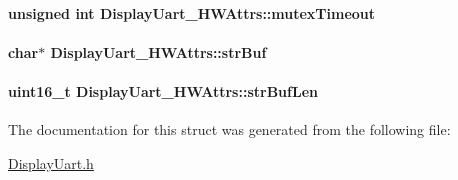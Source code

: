 \paragraph[{mutex\+Timeout}]{\setlength{\rightskip}{0pt plus 5cm}unsigned int Display\+Uart\+\_\+\+H\+W\+Attrs\+::mutex\+Timeout}\label{struct_display_uart___h_w_attrs_a088c26aa2cb1345d33d016617c1db852}
\paragraph[{str\+Buf}]{\setlength{\rightskip}{0pt plus 5cm}char$\ast$ Display\+Uart\+\_\+\+H\+W\+Attrs\+::str\+Buf}\label{struct_display_uart___h_w_attrs_a50486e4fcebccea63bf5233176fa8512}
\paragraph[{str\+Buf\+Len}]{\setlength{\rightskip}{0pt plus 5cm}uint16\+\_\+t Display\+Uart\+\_\+\+H\+W\+Attrs\+::str\+Buf\+Len}\label{struct_display_uart___h_w_attrs_a3a5db18ba55168690f3064f98d7ceaac}


The documentation for this struct was generated from the following file\+:\begin{DoxyCompactItemize}
\item 
\hyperlink{_display_uart_8h}{Display\+Uart.\+h}\end{DoxyCompactItemize}

